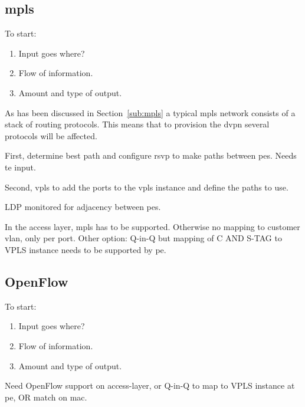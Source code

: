 
\subsection{\acs{mpls}} %
\label{sub:contemporary}
To start:
\begin{enumerate}
	\item Input goes where?
	\item Flow of information.
	\item Amount and type of output.
\end{enumerate}

As has been discussed in Section~\ref{sub:mpls} a typical \ac{mpls} network consists of a stack of routing protocols. This means that to provision the \ac{dvpn} several protocols will be affected. 

First, determine best path and configure \ac{rsvp} to make paths between \acp{pe}. Needs \ac{te} input. 

Second, \ac{vpls} to add the ports to the \ac{vpls} instance and define the paths to use.

LDP monitored for adjacency between \acp{pe}.

In the access layer, \ac{mpls} has to be supported. Otherwise no mapping to customer \ac{vlan}, only per port. Other option: Q-in-Q but mapping of C AND S-TAG to VPLS instance needs to be supported by \ac{pe}.


\subsection{OpenFlow} %
\label{sub:openflow}
To start:
\begin{enumerate}
	\item Input goes where?
	\item Flow of information.
	\item Amount and type of output.
\end{enumerate}



Need OpenFlow support on access-layer, or Q-in-Q to map to VPLS instance at \ac{pe}, OR match on \ac{mac}.






